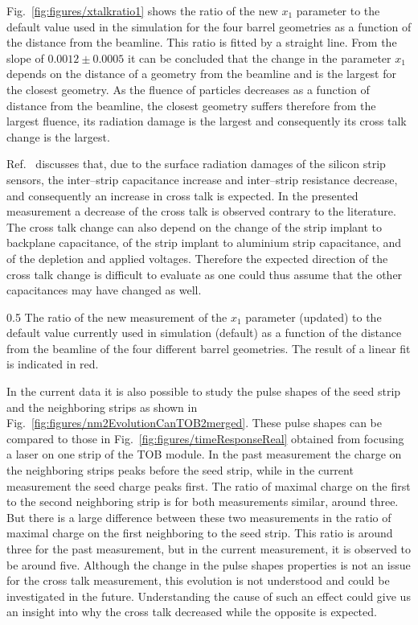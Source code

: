 Fig.~\ref{fig:figures/xtalkratio1} shows the ratio of  the new $x_{1}$ parameter to the default value used in the simulation for the four barrel geometries as a function of the distance from the beamline. This ratio is fitted by a straight line. From the slope of $0.0012 \pm 0.0005$ it can be concluded that the change in the parameter $x_{1}$ depends on the distance of a geometry from the beamline and is the largest for the closest geometry. As the fluence of particles decreases as a function of distance from the beamline, the closest geometry suffers therefore from the largest fluence, its radiation damage is the largest and consequently its cross talk change is the largest.  

Ref.~\cite{Hartmann:2017gzy} discusses that, due to the surface radiation damages of the silicon strip sensors, the inter--strip capacitance increase and inter--strip resistance decrease, and consequently an increase in cross talk is expected. In the presented measurement a decrease of the cross talk is observed contrary to the literature. The cross talk change can also depend on the change of the strip implant to backplane capacitance, of the strip implant to aluminium strip capacitance, and of the depletion and applied voltages. Therefore the expected direction of the cross talk change is difficult to evaluate as one could thus assume that the other capacitances may have changed as well.

                 {0.5}       %
                 {The ratio of the new measurement of the $x_{1}$ parameter (updated) to the default value currently used in simulation (default) as a function of the distance from the beamline of the four different barrel geometries. The result of a linear fit is indicated in red. }


In the current data it is also possible to study the pulse shapes of the seed strip and the neighboring strips as shown in Fig.~\ref{fig:figures/nm2EvolutionCanTOB2merged}. These pulse shapes can be compared to those in Fig.~\ref{fig:figures/timeResponseReal} obtained from focusing a laser on one strip of the TOB module. In the past measurement the charge on the neighboring strips peaks before the seed strip, while in the current measurement the seed charge peaks first. The ratio of maximal charge on the first to the second neighboring strip is for both measurements similar, around three. But there is a large difference between these two measurements in the ratio of maximal charge on the first neighboring to the seed strip. This ratio is around three for the past measurement, but in the current measurement, it is observed to be around five. Although the change in the pulse shapes properties is not an issue for the cross talk measurement, this evolution is not understood and could be investigated in the future. Understanding the cause of such an effect could give us an insight into why the cross talk decreased while the opposite is expected.

